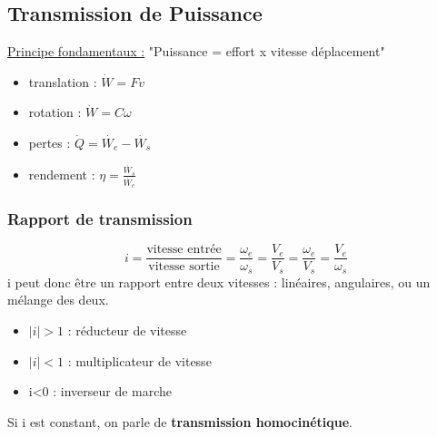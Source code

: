 \documentclass[../main.tex]{subfiles}
\begin{document}
\subsection{Transmission de Puissance}
\quad \underline{Principe fondamentaux :} "Puissance = effort x vitesse déplacement"\\
\begin{minipage}{.5\textwidth}
\begin{itemize}
    \item translation : $\dot{W} = Fv$\\
    \item rotation : $\dot{W} = C\omega$\\
\end{itemize}
\end{minipage}
\begin{minipage}{.5\textwidth}
    \begin{itemize}
        \item pertes : $\dot{Q} = \dot{W_e}-\dot{W_s}$\\
        \item rendement : $\eta = \frac{\dot{W_s}}{\dot{W_e}}$\\
    \end{itemize}
\end{minipage}
\subsubsection{Rapport de transmission}
\begin{equation}
    i = \frac{\text{vitesse entrée}}{\text{vitesse sortie}} = \frac{\omega_e}{\omega_s} = \frac{V_e}{V_s} = \frac{\omega_e}{V_s} = \frac{V_e}{\omega_s}
\end{equation}
i peut donc être un rapport entre deux vitesses : linéaires, angulaires, ou un mélange des deux.\\

\begin{itemize}
    \item $\lvert i \rvert >1$ : réducteur de vitesse\\
    \item $\lvert i \rvert <1$ : multiplicateur de vitesse\\
    \item i<0 : inverseur de marche\\
\end{itemize}

Si i est constant, on parle de \textbf{transmission homocinétique}.\\
\end{document}
